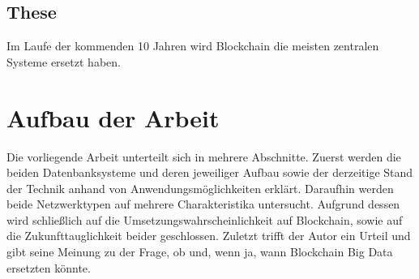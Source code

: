 \subsection{These}
Im Laufe der kommenden 10 Jahren wird Blockchain die meisten zentralen Systeme ersetzt haben.



\section{Aufbau der Arbeit}
Die vorliegende Arbeit unterteilt sich in mehrere Abschnitte.
Zuerst werden die beiden Datenbanksysteme und deren jeweiliger Aufbau sowie der derzeitige Stand der Technik anhand von Anwendungsmöglichkeiten erklärt.
Daraufhin werden beide Netzwerktypen auf mehrere Charakteristika untersucht.
Aufgrund dessen wird schließlich auf die Umsetzungswahrscheinlichkeit auf Blockchain, sowie auf die Zukunfttauglichkeit beider geschlossen.
Zuletzt trifft der Autor ein Urteil und gibt seine Meinung zu der Frage, ob und, wenn ja, wann Blockchain Big Data ersetzten könnte.
